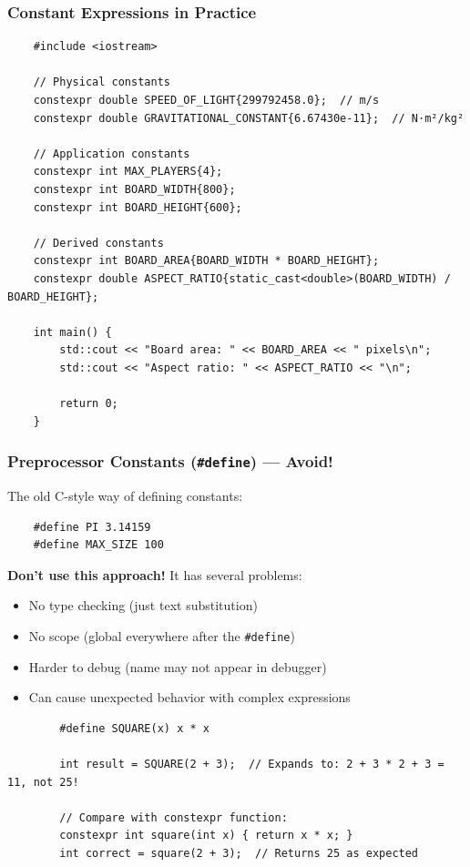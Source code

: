 \subsubsection{Constant Expressions in Practice}

\begin{lstlisting}
	#include <iostream>
	
	// Physical constants
	constexpr double SPEED_OF_LIGHT{299792458.0};  // m/s
	constexpr double GRAVITATIONAL_CONSTANT{6.67430e-11};  // N⋅m²/kg²
	
	// Application constants
	constexpr int MAX_PLAYERS{4};
	constexpr int BOARD_WIDTH{800};
	constexpr int BOARD_HEIGHT{600};
	
	// Derived constants
	constexpr int BOARD_AREA{BOARD_WIDTH * BOARD_HEIGHT};
	constexpr double ASPECT_RATIO{static_cast<double>(BOARD_WIDTH) / BOARD_HEIGHT};
	
	int main() {
		std::cout << "Board area: " << BOARD_AREA << " pixels\n";
		std::cout << "Aspect ratio: " << ASPECT_RATIO << "\n";
		
		return 0;
	}
\end{lstlisting}

\subsubsection{Preprocessor Constants (\texttt{\#define}) — Avoid!}

The old C-style way of defining constants:

\begin{lstlisting}
	#define PI 3.14159
	#define MAX_SIZE 100
\end{lstlisting}

\textbf{Don't use this approach!} It has several problems:
\begin{itemize}
	\item No type checking (just text substitution)
	\item No scope (global everywhere after the \texttt{\#define})
	\item Harder to debug (name may not appear in debugger)
	\item Can cause unexpected behavior with complex expressions
\end{itemize}

\begin{example}{\leavevmode}
	
	\begin{lstlisting}
		#define SQUARE(x) x * x
		
		int result = SQUARE(2 + 3);  // Expands to: 2 + 3 * 2 + 3 = 11, not 25!
		
		// Compare with constexpr function:
		constexpr int square(int x) { return x * x; }
		int correct = square(2 + 3);  // Returns 25 as expected
	\end{lstlisting}
\end{example}

